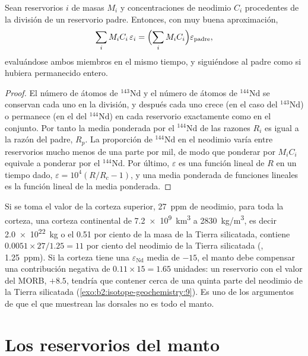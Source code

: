 \begin{proposition}\label{prop:b2:isotope-geochemistry:mass-balance}
Sean reservorios $i$ de masas $M_i$ y concentraciones de neodimio $C_i$ procedentes de
la división de un reservorio padre. Entonces, con muy buena aproximación,
\[
  \sum_i M_i C_i\, \varepsilon_i = \Bigl(\sum_i M_i C_i\Bigr) \varepsilon_{\text{padre}},
\]
evaluándose ambos miembros en el mismo tiempo, y siguiéndose al padre como si
hubiera permanecido entero.
\end{proposition}

\begin{proof}
El número de átomos de $^{143}\mathrm{Nd}$ y el número de átomos de $^{144}\mathrm{Nd}$
se conservan cada uno en la división, y después cada uno crece (en el caso del
$^{143}\mathrm{Nd}$) o permanece (en el del $^{144}\mathrm{Nd}$) en cada reservorio exactamente como
en el conjunto. Por tanto la media ponderada por el $^{144}\mathrm{Nd}$ de las razones $R_i$ es igual a
la razón del padre, $R_p$. La proporción de $^{144}\mathrm{Nd}$ en el neodimio varía
entre reservorios mucho menos de una parte por mil, de modo que ponderar por
$M_iC_i$ equivale a ponderar por el $^{144}\mathrm{Nd}$. Por último, $\varepsilon$ es una
función lineal de $R$ en un tiempo dado, $\varepsilon = 10^4(R/R_c - 1)$, y una
media ponderada de funciones lineales es la función lineal de la media ponderada.
\end{proof}

Si se toma el valor de la corteza superior, \qty{27}{ppm} de neodimio, para toda la
corteza, una corteza continental de \qty{7.2e9}{km^3} a \qty{2830}{kg/m^3}, es decir
\qty{2.0e22}{kg} o el 0.51 por ciento de la masa de la Tierra silicatada, contiene
$0.0051\times27/1.25 = 11$ por ciento del neodimio de la Tierra silicatada (, \qty{1.25}{ppm}). Si la corteza tiene una $\varepsilon_{\mathrm{Nd}}$ media de
$-15$, el manto debe compensar una contribución negativa de $0.11\times15 = 1.65$
unidades: un reservorio con el valor del MORB, $+8.5$, tendría que contener
cerca de una quinta parte del neodimio de la Tierra silicatada (\cref{exo:b2:isotope-geochemistry:9}). Es uno de los
argumentos de que el  que muestrean las dorsales no es todo el
manto.

\section{Los reservorios del manto}

